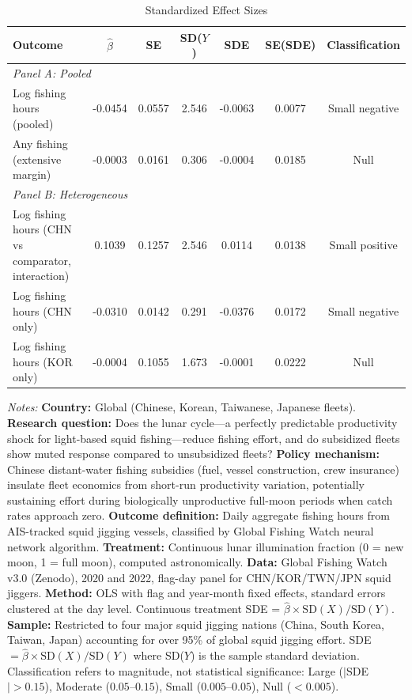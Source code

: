 \begin{table}[htbp]
\centering
\caption{Standardized Effect Sizes}
\label{tab:sde}
\small
\begin{threeparttable}
\begin{tabular}{p{3.8cm}cccccc}
\toprule
Outcome & $\hat{\beta}$ & SE & SD($Y$) & SDE & SE(SDE) & Classification \\
\midrule
\multicolumn{7}{l}{\textit{Panel A: Pooled}} \\
Log fishing hours (pooled) & -0.0454 & 0.0557 & 2.546 & -0.0063 & 0.0077 & Small negative \\
Any fishing (extensive margin) & -0.0003 & 0.0161 & 0.306 & -0.0004 & 0.0185 & Null \\
\midrule
\multicolumn{7}{l}{\textit{Panel B: Heterogeneous}} \\
Log fishing hours (CHN vs comparator, interaction) & 0.1039 & 0.1257 & 2.546 & 0.0114 & 0.0138 & Small positive \\
Log fishing hours (CHN only) & -0.0310 & 0.0142 & 0.291 & -0.0376 & 0.0172 & Small negative \\
Log fishing hours (KOR only) & -0.0004 & 0.1055 & 1.673 & -0.0001 & 0.0222 & Null \\
\bottomrule
\end{tabular}
\begin{tablenotes}[flushleft]
\footnotesize
\item \textit{Notes:}
\textbf{Country:} Global (Chinese, Korean, Taiwanese, Japanese fleets).
\textbf{Research question:} Does the lunar cycle---a perfectly predictable productivity shock for light-based squid fishing---reduce fishing effort, and do subsidized fleets show muted response compared to unsubsidized fleets?
\textbf{Policy mechanism:} Chinese distant-water fishing subsidies (fuel, vessel construction, crew insurance) insulate fleet economics from short-run productivity variation, potentially sustaining effort during biologically unproductive full-moon periods when catch rates approach zero.
\textbf{Outcome definition:} Daily aggregate fishing hours from AIS-tracked squid jigging vessels, classified by Global Fishing Watch neural network algorithm.
\textbf{Treatment:} Continuous lunar illumination fraction (0 = new moon, 1 = full moon), computed astronomically.
\textbf{Data:} Global Fishing Watch v3.0 (Zenodo), 2020 and 2022, flag-day panel for CHN/KOR/TWN/JPN squid jiggers.
\textbf{Method:} OLS with flag and year-month fixed effects, standard errors clustered at the day level. Continuous treatment SDE = $\hat{\beta} \times \text{SD}(X) / \text{SD}(Y)$.
\textbf{Sample:} Restricted to four major squid jigging nations (China, South Korea, Taiwan, Japan) accounting for over 95\% of global squid jigging effort.
SDE $= \hat{\beta} \times \text{SD}(X) / \text{SD}(Y)$ where SD($Y$) is the sample standard deviation.
Classification refers to magnitude, not statistical significance: Large ($|$SDE$| > 0.15$), Moderate ($0.05$--$0.15$), Small ($0.005$--$0.05$), Null ($< 0.005$). 
\end{tablenotes}
\end{threeparttable}
\end{table}
